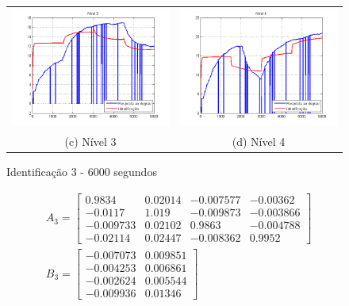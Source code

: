 \begin{itemize}
\begin{figure}[H]
\begin{tabular}{cc}
		\includegraphics[height=0.15\paperheight,keepaspectratio]{img/ident3_h3.png} &
		\includegraphics[height=0.15\paperheight,keepaspectratio]{img/ident3_h4.png} \\
		(c) Nível 3 &
		(d) Nível 4
	\end{tabular}
	\caption{\label{imgID_6Results} Identificação 3 - 6000 segundos}
\end{figure}

\begin{align*}
	& A_3 =
	\begin{bmatrix}
		   0.9834 & 0.02014 & -0.007577 &  -0.00362 \\
		  -0.0117 &   1.019 & -0.009873 & -0.003866 \\
		-0.009733 & 0.02102 &    0.9863 & -0.004788 \\
		 -0.02114 & 0.02447 & -0.008362 &    0.9952
	\end{bmatrix} \\
	& B_3 =
	\begin{bmatrix}
		-0.007073  & 0.009851 \\
		-0.004253  & 0.006861 \\
		-0.002624  & 0.005544 \\
		-0.009936  &  0.01346
	\end{bmatrix}
\end{align*}
\end{itemize}

